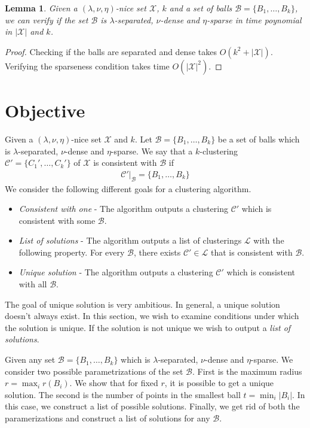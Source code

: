 \documentclass[twoside]{article}
\newcommand{\mc}{\mathcal}
\newtheorem{lemma}[theorem]{Lemma}
\begin{document}
\vspace{1mm}
\begin{lemma}
\label{lemma:chknice}
Given a $(\lambda,\nu, \eta)$-nice set $\mc X$, $k$ and a set of balls $\mc B = \{B_1,\ldots,B_k\}$, we can verify if the set $\mc B$ is $\lambda$-separated, $\nu$-dense and $\eta$-sparse in time poynomial in $|\mc X|$ and $k$.
\end{lemma}
\begin{proof}
Checking if the balls are separated and dense takes $O(k^2 + |\mc X|)$. Verifying the sparseness condition takes time $O(|\mc X|^2)$.
\end{proof}


\section{Objective}
\label{objective}
Given a $(\lambda, \nu, \eta)$-nice set $\mc X$ and $k$. Let $\mc B = \{B_1,\ldots,B_k\}$ be a set of balls which is $\lambda$-separated, $\nu$-dense and $\eta$-sparse. We say that a $k$-clustering $\mc C' =\{C_1',\ldots,C_k'\}$ of $\mc X$ is consistent with $\mc B$ if
\begin{align*}
	\mc C'|_\mc B = \{B_1,\ldots,B_k\}
\end{align*}
We consider the following different goals for a clustering algorithm. 
\begin{itemize}[noitemsep,nolistsep]
\item {\em Consistent with one} - The algorithm outputs a clustering $\mc C'$ which is consistent with some $\mc B$.
\item {\em List of solutions} - The algorithm outputs a list of clusterings $\mc L$ with the following property. For every $\mc B$, there exists $\mc C' \in \mc L$ that is consistent with $\mc B$.
\item {\em Unique solution} - The algorithm outputs a clustering $\mc C'$ which is consistent with all $\mc B$.
\end{itemize}

The goal of unique solution is very ambitious. In general, a unique solution doesn't always exist. In this section, we wish to examine conditions under which the solution is unique. If the solution is not unique we wish to output a {\em list of solutions}.  

Given any set $\mc B = \{B_1,\ldots, B_k\}$ which is $\lambda$-separated, $\nu$-dense and $\eta$-sparse. We consider two possible parametrizations of the set $\mc B$. First is the maximum radius $r = \max_i r(B_i)$. We show that for fixed $r$, it is possible to get a unique solution. The second is the number of points in the smallest ball $t = \min_i |B_i|$. In this case, we construct a list of possible solutions. Finally, we get rid of both the paramerizations and construct a list of solutions for any $\mc B$.
\end{document}
